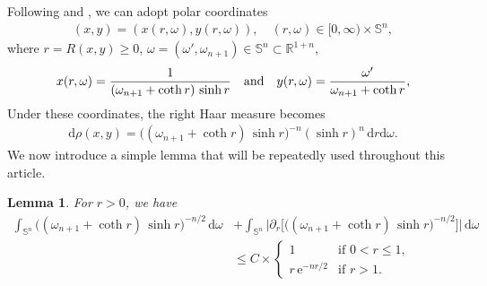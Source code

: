 \documentclass[a4paper,12pt]{amsart}
\numberwithin{equation}{section}
\newtheorem{lemma}[theorem]{Lemma}
\theoremstyle{definition}
\theoremstyle{remark}
\numberwithin{theorem}{section}
\newcommand{\R}{\mathbb{R}}
\newcommand{\e}{\mathrm{e}}
\renewcommand{\SS}{\mathbb{S}}
\renewcommand{\d}{\mathrm{d}}
\begin{document}
Following \cite[p. 21 and p. 136]{Pe2} and \cite[Exercise 3.18]{Gr}, we can adopt polar coordinates 
\begin{align*}
(x,y)=(x(r,\omega),y(r,\omega)), \quad (r,\omega)\in [0,\infty)\times \SS^n,
\end{align*}
where $r=R(x,y)\geq 0$, $\omega=(\omega',\omega_{n+1})\in \SS^n\subset \R^{1+n}$,
\begin{align}\label{pol}
x(r,\omega)={1\over(\omega_{n+1}+\coth r)\, \sinh r}\quad \mbox{and} \quad y(r,\omega)={\omega'\over \omega_{n+1}+\coth r},
\end{align}
Under these coordinates, the right Haar measure becomes
\begin{align}\label{e2.5}
\d \rho(x,y)=\big((\omega_{n+1}+\coth r)\, \sinh r\big)^{-n}(\sinh r)^n\,\d r\d\omega.
\end{align}
We now introduce a simple lemma that will be repeatedly used throughout this article.
\begin{lemma}\label{lem2.1}
For $r>0$, we have
\begin{align*}
\int_{\SS^n}\big((\omega_{n+1}+\coth r)\, \sinh r \big)^{-n/2}\,\d\omega&+\int_{\SS^n}\Big|\partial_r\!\Big[\big((\omega_{n+1}+\coth r)\, \sinh r \big)^{-n/2}\Big]\Big|\,\d\omega\\[2pt]
& \leq C\times \begin{cases}
1&\mbox{if }0<r\leq 1,\\
r\,\e^{-nr/2}&\mbox{if }r>1.
\end{cases}
\end{align*}
\end{lemma}
\end{document}

